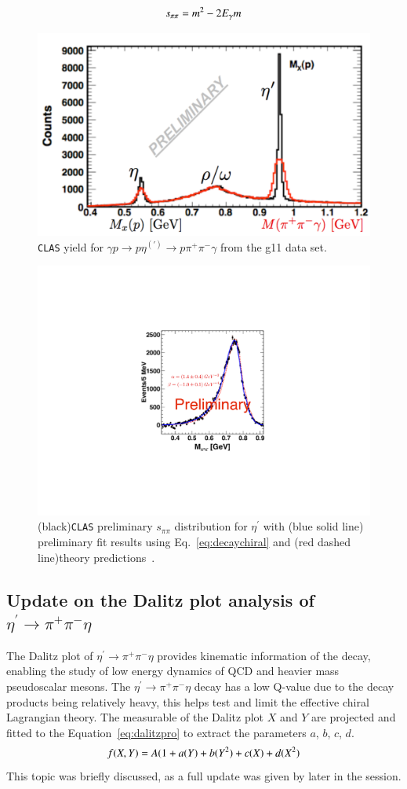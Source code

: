 \documentclass[epj]{webofc}
\begin{document}
\begin{equation}
s_{\pi\pi} = m^2 - 2E_{\gamma}m \label{eq:spipi} \\
\end{equation}
\begin{figure}[h]
	\centerline{\includegraphics[width=150 pt, height = 100 pt ]{figures/clas_g11data.pdf}}
	\caption{\textsc{\texttt{CLAS}} yield for $\gamma p \to p \eta^{(\prime)} \to p \pi^+ \pi^- \gamma $ from the g11 data set.}
	\label{fig:boxCLASdata}
\end{figure}
\begin{figure}[h!]
	\centerline{\includegraphics[width=150 pt]{figures/GeorgieLMD_May_06_16_tempIII.pdf}}
	\caption{(black)\textsc{\texttt{CLAS}} preliminary $s_{\pi\pi}$ distribution for $\eta^{\prime}$ with (blue solid line) preliminary fit results using Eq.~\ref{eq:decaychiral} and (red dashed line)theory predictions~\cite{Kubis2015}.}
	\label{fig:boxCLAS}
\end{figure}
\FloatBarrier
\subsection{Update on the Dalitz plot analysis of $\eta^{\prime} \to \pi^+ \pi^- \eta$}
The Dalitz plot of $\eta^{\prime} \to \pi^+ \pi^- \eta$ provides kinematic information of the decay, enabling the study of low energy dynamics of QCD and heavier mass pseudoscalar mesons. The  $\eta^{\prime} \to \pi^+ \pi^- \eta$ decay has a low Q-value due to the decay products being relatively heavy, this helps test and limit the effective chiral Lagrangian theory. The measurable of the Dalitz plot $X$ and $Y$ are projected and fitted to the Equation~\ref{eq:dalitzpro} to extract the parameters $a$, $b$, $c$, $d$. %
\begin{equation}
f(X,Y) = A(1+a(Y) + b (Y^2) + c(X) + d(X^2)  \label{eq:dalitzpro} \\
\end{equation}
%
This topic was briefly discussed, as a full update was given by later in the session.
\end{document}
